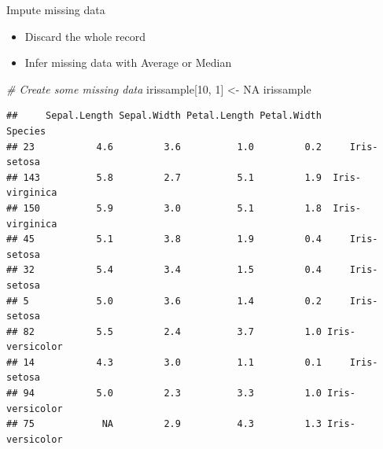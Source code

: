 \documentclass[ignorenonframetext,]{beamer}
\newenvironment{Shaded}{\begin{snugshade}}{\end{snugshade}}
\newcommand{\DecValTok}[1]{\textcolor[rgb]{0.00,0.00,0.81}{{#1}}}
\newcommand{\StringTok}[1]{\textcolor[rgb]{0.31,0.60,0.02}{{#1}}}
\newcommand{\CommentTok}[1]{\textcolor[rgb]{0.56,0.35,0.01}{\textit{{#1}}}}
\newcommand{\OtherTok}[1]{\textcolor[rgb]{0.56,0.35,0.01}{{#1}}}
\newcommand{\NormalTok}[1]{{#1}}
\providecommand{\tightlist}{%
\setlength{\itemsep}{0pt}\setlength{\parskip}{0pt}}
\begin{document}
\begin{frame}[fragile]{Impute missing data}

\begin{itemize}
\tightlist
\item
  Discard the whole record
\item
  Infer missing data with Average or Median
\end{itemize}

\begin{Shaded}
\begin{Highlighting}[]
\CommentTok{# Create some missing data}
\NormalTok{irissample[}\DecValTok{10}\NormalTok{, }\DecValTok{1}\NormalTok{] <-}\StringTok{ }\OtherTok{NA}
\NormalTok{irissample}
\end{Highlighting}
\end{Shaded}

\begin{verbatim}
##     Sepal.Length Sepal.Width Petal.Length Petal.Width         Species
## 23           4.6         3.6          1.0         0.2     Iris-setosa
## 143          5.8         2.7          5.1         1.9  Iris-virginica
## 150          5.9         3.0          5.1         1.8  Iris-virginica
## 45           5.1         3.8          1.9         0.4     Iris-setosa
## 32           5.4         3.4          1.5         0.4     Iris-setosa
## 5            5.0         3.6          1.4         0.2     Iris-setosa
## 82           5.5         2.4          3.7         1.0 Iris-versicolor
## 14           4.3         3.0          1.1         0.1     Iris-setosa
## 94           5.0         2.3          3.3         1.0 Iris-versicolor
## 75            NA         2.9          4.3         1.3 Iris-versicolor
\end{verbatim}

\end{frame}
\end{document}
